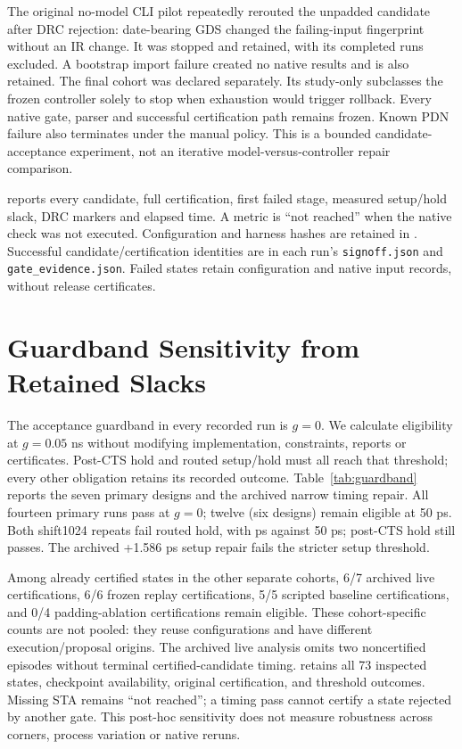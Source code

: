 \documentclass[runningheads]{llncs}
\newcommand{\code}[1]{\texttt{#1}}
\begin{document}
The original no-model CLI pilot repeatedly rerouted the unpadded candidate
after DRC rejection: date-bearing GDS changed the failing-input fingerprint
without an IR change. It was stopped and retained, with its completed runs
excluded. A bootstrap import failure created no native results and is also
retained. The final cohort was declared separately. Its study-only
 subclasses the frozen controller
solely to stop when exhaustion would trigger rollback. Every native gate,
parser and successful certification path remains frozen. Known PDN failure
also terminates under the manual policy. This is a bounded candidate-acceptance
experiment, not an iterative model-versus-controller repair comparison.

 reports every
candidate, full certification, first failed stage, measured setup/hold slack,
DRC markers and elapsed time. A metric is ``not reached'' when the native check
was not executed. Configuration and harness hashes are retained in
.
Successful candidate/certification identities are in each run's
\code{signoff.json} and \code{gate\_evidence.json}. Failed states retain
configuration and native input records, without release certificates.

\section{Guardband Sensitivity from Retained Slacks}
The acceptance guardband in every recorded run is $g=0$. We calculate
eligibility at $g=0.05$ ns without modifying implementation, constraints,
reports or certificates. Post-CTS hold and routed setup/hold must all reach
that threshold; every other obligation retains its recorded outcome.
Table~\ref{tab:guardband} reports the seven primary designs and the archived
narrow timing repair. All fourteen primary runs pass at $g=0$; twelve
(six designs) remain eligible at 50 ps. Both shift1024 repeats fail routed
hold, with \GuardbandShiftHoldPs{} ps against 50 ps; post-CTS hold still passes.
The archived +1.586 ps setup repair fails the stricter setup threshold.


Among already certified states in the other separate cohorts, 6/7 archived
live certifications, 6/6 frozen replay certifications, 5/5 scripted baseline
certifications, and 0/4 padding-ablation certifications remain eligible.
These cohort-specific counts are not pooled: they reuse configurations and
have different execution/proposal origins. The archived live analysis omits
two noncertified episodes without terminal certified-candidate timing.
 retains
all 73 inspected states, checkpoint availability, original certification,
and threshold outcomes. Missing STA remains ``not reached''; a timing pass
cannot certify a state rejected by another gate. This post-hoc sensitivity
does not measure robustness across corners, process variation or native reruns.
\end{document}
